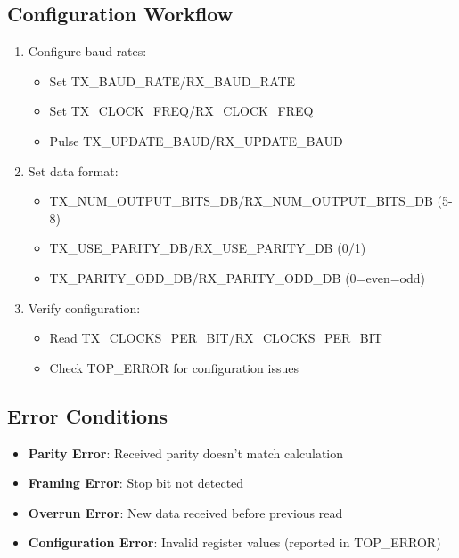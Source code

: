 \subsection{Configuration Workflow}
\begin{enumerate}
\item Configure baud rates:
  \begin{itemize}
  \item Set TX\_BAUD\_RATE/RX\_BAUD\_RATE
  \item Set TX\_CLOCK\_FREQ/RX\_CLOCK\_FREQ
  \item Pulse TX\_UPDATE\_BAUD/RX\_UPDATE\_BAUD
  \end{itemize}

\item Set data format:
  \begin{itemize}
  \item TX\_NUM\_OUTPUT\_BITS\_DB/RX\_NUM\_OUTPUT\_BITS\_DB (5-8)
  \item TX\_USE\_PARITY\_DB/RX\_USE\_PARITY\_DB (0/1)
  \item TX\_PARITY\_ODD\_DB/RX\_PARITY\_ODD\_DB (0=even=odd)
  \end{itemize}

\item Verify configuration:
  \begin{itemize}
  \item Read TX\_CLOCKS\_PER\_BIT/RX\_CLOCKS\_PER\_BIT
  \item Check TOP\_ERROR for configuration issues
  \end{itemize}
\end{enumerate}

\subsection{Error Conditions}
\begin{itemize}
\item \textbf{Parity Error}: Received parity doesn't match calculation
\item \textbf{Framing Error}: Stop bit not detected
\item \textbf{Overrun Error}: New data received before previous read
\item \textbf{Configuration Error}: Invalid register values (reported in TOP\_ERROR)
\end{itemize}